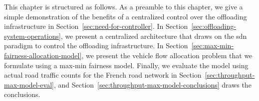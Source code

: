 This chapter is structured as follows. As a preamble to this chapter, we give a simple demonstration of the benefits of a centralized control over the offloading infrastructure in Section~\ref{sec:need-for-controller}. In Section~\ref{sec:offloading-system-operations}, we present a centralized architecture that draws on the \acrshort{sdn} paradigm to control the offloading infrastructure. In Section~\ref{sec:max-min-fairness-allocation-model}, we present the vehicle flow allocation problem that we formulate using a max-min fairness model. Finally, we evaluate the model using actual road traffic counts for the French road network in Section~\ref{sec:throughput-max-model-eval}, and Section~\ref{sec:throughput-max-model-conclusions} draws the conclusions. %




    



